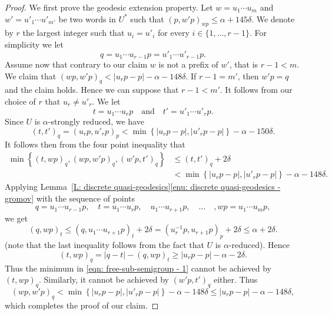 \documentclass[11pt]{article}
\theoremstyle{plain}
\theoremstyle{definition}
\begin{document}
\begin{proof}
We first prove the geodesic extension property.
Let $w = u_1\cdots u_m$ and $w' = u'_1\cdots u'_{m'}$ be two words in $U^*$ such that $(p, w'p)_{wp} \leq \alpha +145\delta$.
We denote by $r$ the largest integer such that $u_i = u'_i$ for every $i \in \{1, \dots, r-1\}$.
For simplicity we let
\begin{equation*}
q = u_1\cdots u_{r-1} p = u'_1 \cdots u'_{r-1}p.
\end{equation*}
Assume now that contrary to our claim $w$ is not a prefix of $w'$, that is $r - 1 < m$.
We claim that $(wp, w'p)_q < |u_rp - p| - \alpha - 148\delta$.
If $r-1 = m'$, then $w'p = q$ and the claim holds.
Hence we can suppose that $r-1 < m'$.
It follows from our choice of $r$ that $u_r \neq u'_r$.
We let
\begin{equation*}
t = u_1\cdots u_rp
\quad \text{and} \quad
t' = u'_1 \cdots u'_rp.
\end{equation*}
Since $U$ is $\alpha$-strongly reduced, we have
\begin{equation*}
\left(t,t'\right)_q = (u_rp, u'_rp)_p < \min \left\{ |u_rp -p|, |u'_rp - p|\right\} - \alpha - 150\delta.
\end{equation*}
It follows then from the four point inequality that
\begin{equation} \label{eqn: free-sub-semigroup - 1}
\begin{split}
\min\left\{ (t,wp)_q, (wp,w'p)_q, (w'p,t')_q\right\} & \leq (t,t')_q +2\delta
\\& < \min \left\{ |u_rp -p|, |u'_rp - p|\right\} - \alpha - 148\delta.
\end{split}
\end{equation}
Applying Lemma~\ref{L: discrete quasi-geodesics}\eqref{enu: discrete quasi-geodesics - gromov} with the sequence of points
\begin{equation*}
q = u_1\cdots u_{r-1}p, \quad t = u_1\cdots u_rp, \quad u_1\cdots u_{r+1}p, \quad\dots\quad, wp = u_1\cdots u_mp,
\end{equation*}
we get
\begin{equation*}
(q,wp)_t \leq (q, u_1\cdots u_{r+1}p)_t + 2 \delta
= (u_r^{-1}p, u_{r+1}p)_p + 2 \delta
\leq \alpha + 2\delta.
\end{equation*}
(note that the last inequality follows from the fact that $U$ is $\alpha$-reduced).
Hence
\begin{equation*}
(t,wp)_q = |q-t| - (q,wp)_t \geq |u_rp - p| - \alpha - 2\delta.
\end{equation*}
Thus the minimum in \eqref{eqn: free-sub-semigroup - 1} cannot be achieved by $(t,wp)_q$.
Similarly, it cannot be achieved by $(w'p,t')_q$ either.
Thus
\begin{equation*}
\left(wp,w'p\right)_q < \min \left\{ |u_rp -p|, |u'_rp - p|\right\} - \alpha - 148\delta \leq |u_rp - p| - \alpha - 148\delta,
\end{equation*}
which completes the proof of our claim.


\end{proof}
\end{document}
